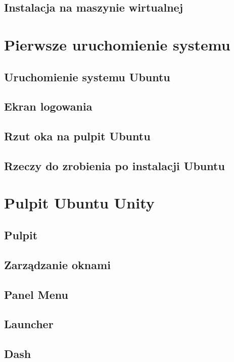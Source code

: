 \documentclass[a4paper,11pt,oneside]{mwart}
\begin{document}
	\subsection{Instalacja na maszynie wirtualnej}
				
\section{Pierwsze uruchomienie systemu}
	\label{sec:pierwsze_uruchomienie}
	\subsection{Uruchomienie systemu Ubuntu}
		
	\subsection{Ekran logowania}
		
	\subsection{Rzut oka na pulpit Ubuntu}
		
	\subsection{Rzeczy do zrobienia po instalacji Ubuntu}
		\label{sec:rzeczy_do_zrobienia_po_instalacji}
		
\section{Pulpit Ubuntu Unity}
	\subsection{Pulpit}
	\subsection{Zarządzanie oknami}
	\subsection{Panel Menu}
	\subsection{Launcher}
	\subsection{Dash}
\end{document}

